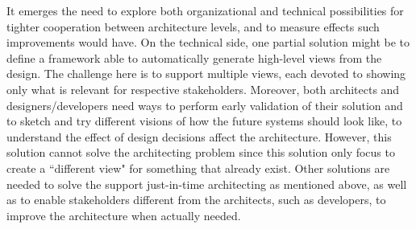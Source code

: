 It emerges the need to explore both organizational and technical
possibilities for tighter cooperation between architecture levels, and to
measure effects such improvements would have. On the technical side, one partial solution might be %
to define a framework able to automatically generate high-level views from the
design. The challenge here is to support multiple views, each
devoted to showing only what is relevant for respective stakeholders. Moreover,
both architects and designers/developers need ways to perform early validation
of their solution and to sketch and try different visions of how the future
systems should look like, to understand the effect of design decisions affect
the architecture. 
However, this solution cannot solve the architecting problem since this solution only focus to create a ``different view" for something that already exist. Other solutions are needed to solve the support just-in-time %
architecting as mentioned above, as well as to enable stakeholders different from the architects, such as developers, to improve the architecture when actually needed.


